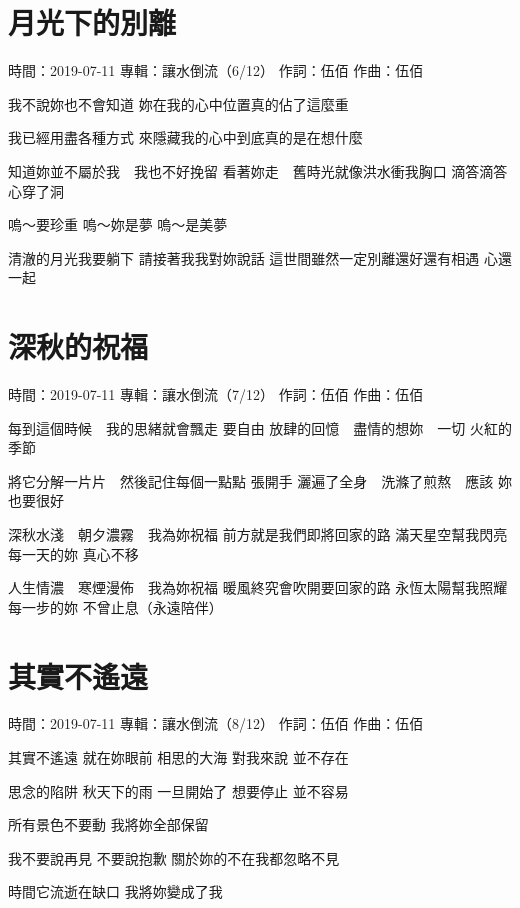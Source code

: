 \documentclass[UTF8,a4paper,oneside,twocolumn,12pt]{ctexbook}
\newcommand{\infopair}[2]{\textbullet #1：#2}
\newcommand{\zc}[1][伍佰]{\infopair{作詞}{#1}}
\newcommand{\zq}[1][伍佰]{\infopair{作曲}{#1}}
\newcommand{\zj}[1]{\infopair{專輯}{#1}}
\newcommand{\sj}[1]{\infopair{時間}{#1}}
\newenvironment{info}{\begin{flushleft}\kaishu
	}
	{\end{flushleft}\normalsize\yahei\par}
\newenvironment{lyric}{
	}
{}
\begin{document}
\section{月光下的別離}
\begin{info}
	\sj{2019-07-11}
	\zj{讓水倒流（6/12）}
	\zc
	\zq
\end{info}
\begin{lyric}
	我不說妳也不會知道
	妳在我的心中位置真的佔了這麼重

	我已經用盡各種方式
	來隱藏我的心中到底真的是在想什麼

	知道妳並不屬於我　我也不好挽留
	看著妳走　舊時光就像洪水衝我胸口
	滴答滴答心穿了洞

	嗚～要珍重
	嗚～妳是夢
	嗚～是美夢

	清澈的月光我要躺下
	請接著我我對妳說話
	這世間雖然一定別離還好還有相遇
	心還一起
\end{lyric}

\section{深秋的祝福}
\begin{info}
	\sj{2019-07-11}
	\zj{讓水倒流（7/12）}
	\zc
	\zq
\end{info}
\begin{lyric}
	每到這個時候　我的思緒就會飄走
	要自由
	放肆的回憶　盡情的想妳　一切
	火紅的季節

	將它分解一片片　然後記住每個一點點
	張開手
	灑遍了全身　洗滌了煎熬　應該
	妳也要很好

	深秋水淺　朝夕濃霧　我為妳祝福
	前方就是我們即將回家的路
	滿天星空幫我閃亮每一天的妳
	真心不移

	人生情濃　寒煙漫佈　我為妳祝福
	暖風終究會吹開要回家的路
	永恆太陽幫我照耀每一步的妳
	不曾止息（永遠陪伴）
\end{lyric}

\section{其實不遙遠}
\begin{info}
	\sj{2019-07-11}
	\zj{讓水倒流（8/12）}
	\zc
	\zq
\end{info}
\begin{lyric}
	其實不遙遠
	就在妳眼前
	相思的大海
	對我來說 並不存在

	思念的陷阱
	秋天下的雨
	一旦開始了
	想要停止 並不容易

	所有景色不要動
	我將妳全部保留

	我不要說再見 不要說抱歉
	關於妳的不在我都忽略不見

	時間它流逝在缺口
	我將妳變成了我
\end{lyric}
\end{document}
